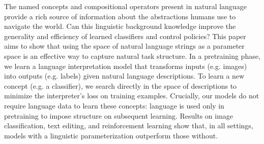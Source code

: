 The named concepts and compositional operators present in natural language provide a rich source of information about the abstractions humans use to navigate the world. Can this linguistic background knowledge improve the generality and efficiency of learned classifiers and control policies? This paper aims to show that using the space of natural language strings as a parameter space is an effective way to capture natural task structure. In a pretraining phase, we learn a language interpretation model that transforms inputs (e.g. images) into outputs (e.g. labels) given natural language descriptions. To learn a new concept (e.g. a classifier), we search directly in the space of descriptions to minimize the interpreter's loss on training examples. Crucially, our models do not require language data to learn these concepts: language is used only in pretraining to impose structure on subsequent learning. Results on image classification, text editing, and reinforcement learning show that, in all settings, models with a linguistic parameterization outperform those without.
